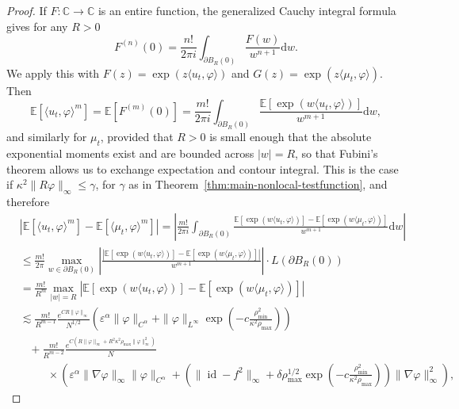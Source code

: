 \documentclass[10pt,a4paper]{amsart}
\newcommand{\C}{\mathbb{C}}
\newcommand{\mathd}{\mathrm{d}}
\begin{document}
\begin{proof}
    If $F:\C\to\C$ is an entire function, the generalized Cauchy integral formula gives for any $R > 0$
\[ F^{(n)} (0) = \frac{n!}{2 \pi i} \int_{\partial B_R (0)} \frac{F
   (w)}{w^{n + 1}} \mathd w. \]
We apply this with $F (z) = \exp (z \langle u_t, \varphi \rangle)$ and $G (z)
= \exp (z \langle \mu_t, \varphi \rangle)$. Then 
\[
    \mathbb{E} [\langle u_t, \varphi \rangle^m] =\mathbb{E} [F^{(m)} (0)] =
   \frac{m!}{2 \pi i} \int_{\partial B_R (0)} \frac{\mathbb{E} [\exp (w
   \langle u_t, \varphi \rangle)]}{w^{m + 1}} \mathd w,
\]
and similarly for $\mu_t$, provided that $R>0$ is small enough that the absolute exponential moments exist and are bounded across $|w|=R$, so that Fubini's theorem allows us to exchange expectation and contour integral. This is the case if $\kappa^2\|R\varphi\|_\infty \leq \gamma$, for $\gamma$ as in Theorem~\ref{thm:main-nonlocal-testfunction}, and therefore
\begin{align} \nonumber
  &| \mathbb{E} [\langle u_t, \varphi \rangle^m] -\mathbb{E} [\langle \mu_t,
  \varphi \rangle^m] | = \left| \frac{m!}{2 \pi i} \int_{\partial B_R
  (0)} \frac{\mathbb{E} [\exp (w \langle u_t, \varphi \rangle)] -\mathbb{E}
  [\exp (w \langle \mu_t, \varphi \rangle)]}{w^{m + 1}} \mathd w \right|\\ \nonumber
  & \leq \frac{m!}{2 \pi} \max_{w \in \partial B_R (0)} \left| \frac{|
  \mathbb{E} [\exp (w \langle u_t, \varphi \rangle)] -\mathbb{E} [\exp (w
  \langle \mu_t, \varphi \rangle)] |}{w^{m + 1}} \right| \cdot L (\partial B_R
  (0))\\ \nonumber
  &= \frac{m!}{R^m} \max_{| w | = R} | \mathbb{E} [\exp (w \langle u_t,
  \varphi \rangle)] -\mathbb{E} [\exp (w \langle \mu_t, \varphi \rangle)] | \\ \nonumber
  &\lesssim \frac{m!}{R^{m-1}}\frac{e^{CR\|\varphi\|_\infty}}{N^{1/2}}\left(\varepsilon^\alpha \|\varphi\|_{C^\alpha}
        + \|\varphi\|_{L^\infty} 
        \exp\left(-c \frac{\rho_{\min}^2}{\kappa^2\rho_{\max}}\right)\right)\\ \nonumber
    & \hspace{10pt}+ \frac{m!}{R^{m-2}}\frac{e^{C (R\| \varphi \|_{\infty} + R^2\kappa^2 \rho_{\max}\| \varphi \|_{\infty}^2 )}}{N}\\
    & \hspace{30pt} \times \left(\varepsilon^{\alpha} \|\nabla \varphi\|_\infty \| \varphi \|_{C^{\alpha}} + (\| \operatorname{id} - f^2 \|_{\infty} + \delta \rho_{\max}^{1/2} \exp\left(-c \frac{\rho_{\min}^2}{\kappa^2\rho_{\max}}\right)) \| \nabla \varphi \|_{\infty}^2\right), \label{eq:moment-pr1}

\end{align}
\end{proof}
\end{document}
